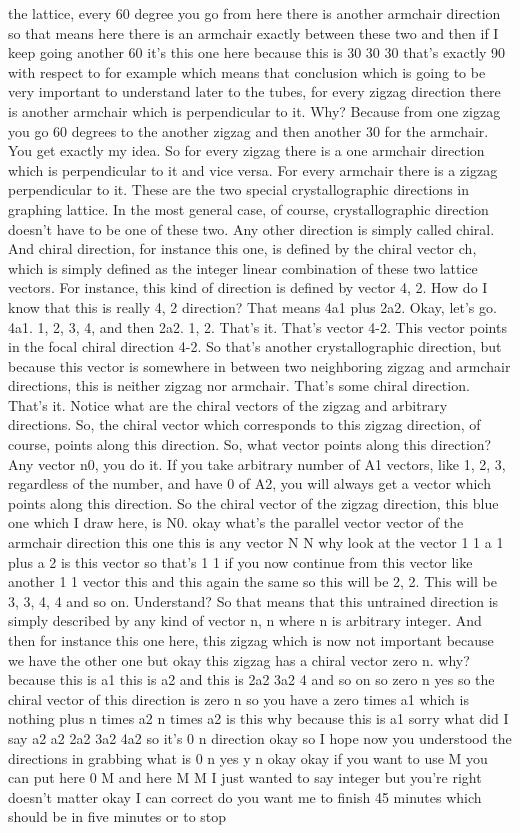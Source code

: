 the lattice, every 60 degree you go from here there is another armchair direction so that means here there is an armchair exactly between these two and then if I keep going another 60 it's this one here because this is 30 30 30 that's exactly 90 with respect to for example which means that conclusion which is going to be very important to understand later to the tubes, for every zigzag direction there is another armchair which is perpendicular to it. Why? Because from one zigzag you go 60 degrees to the another zigzag and then another 30 for the armchair. You get exactly my idea. So for every zigzag there is a one armchair direction which is perpendicular to it and vice versa. For every armchair there is a zigzag perpendicular to it. These are the two special crystallographic directions in graphing lattice. In the most general case, of course, crystallographic direction doesn't have to be one of these two. Any other direction is simply called chiral. And chiral direction, for instance this one, is defined by the chiral vector ch, which is simply defined as the integer linear combination of these two lattice vectors. For instance, this kind of direction is defined by vector 4, 2. How do I know that this is really 4, 2 direction? That means 4a1 plus 2a2. Okay, let's go. 4a1. 1, 2, 3, 4, and then 2a2. 1, 2. That's it. That's vector 4-2. This vector points in the focal chiral direction 4-2. So that's another crystallographic direction, but because this vector is somewhere in between two neighboring zigzag and armchair directions, this is neither zigzag nor armchair. That's some chiral direction. That's it. Notice what are the chiral vectors of the zigzag and arbitrary directions. So, the chiral vector which corresponds to this zigzag direction, of course, points along this direction. So, what vector points along this direction? Any vector n0, you do it. If you take arbitrary number of A1 vectors, like 1, 2, 3, regardless of the number, and have 0 of A2, you will always get a vector which points along this direction. So the chiral vector of the zigzag direction, this blue one which I draw here, is N0. okay what's the parallel vector vector of the armchair direction this one this is any vector N N why look at the vector 1 1 a 1 plus a 2 is this vector so that's 1 1 if you now continue from this vector like another 1 1 vector this and this again the same so this will be 2, 2. This will be 3, 3, 4, 4 and so on. Understand? So that means that this untrained direction is simply described by any kind of vector n, n where n is arbitrary integer. And then for instance this one here, this zigzag which is now not important because we have the other one but okay this zigzag has a chiral vector zero n. why? because this is a1 this is a2 and this is 2a2 3a2 4 and so on so zero n yes so the chiral vector of this direction is zero n so you have a zero times a1 which is nothing plus n times a2 n times a2 is this why because this is a1 sorry what did I say a2 a2 2a2 3a2 4a2 so it's 0 n direction okay so I hope now you understood the directions in grabbing what is 0 n yes y n okay okay if you want to use M you can put here 0 M and here M M I just wanted to say integer but you're right doesn't matter okay I can correct do you want me to finish 45 minutes which should be in five minutes or to stop 